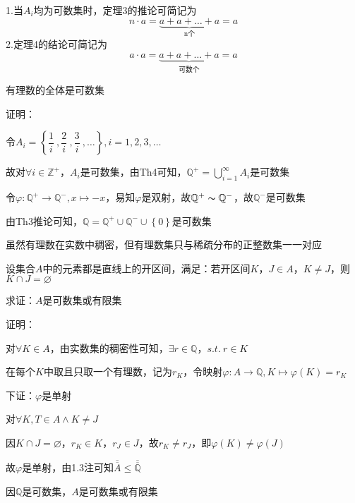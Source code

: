 \begin{wa}
1.当$A_{i}$均为可数集时，定理3的推论可简记为
$$n \cdot a = \underbrace{a + a + \dots + a }_\text{n个}= a$$
\quad \quad \quad 2.定理4的结论可简记为
$$a \cdot a = \underbrace{a + a + \dots + a }_\text{可数个}= a$$    
\end{wa}

\begin{td}
有理数的全体是可数集   
\end{td}
\noindent 证明：
\par 令$A_{i} = \left\{\dfrac{1}{i} \ ,\dfrac{2}{i} \ ,\dfrac{3}{i} \ ,\dots\right\} ,i = 1,2,3,\dots$
\par 故对$\forall i \in \mathbb{Z}^{+}$，$A_{i}$是可数集，由Th4可知，$\mathbb{Q}^{+} = \bigcup \limits_{i=1}^{\infty}A_{i}$是可数集
\par 令$\varphi : \mathbb{Q}^{+} \to \mathbb{Q}^{-} , x \mapsto -x$，易知$\varphi $是双射，故$\mathbb{Q}^{+} \thicksim \mathbb{Q}^{-}$，故$\mathbb{Q}^{-}$是可数集
\par 由Th3推论可知，$\mathbb{Q} = \mathbb{Q}^{+} \cup \mathbb{Q}^{-} \cup \left\{0\right\} $是可数集

\begin{wa}
虽然有理数在实数中稠密，但有理数集只与稀疏分布的正整数集一一对应    
\end{wa}

\begin{eg}
设集合$A$中的元素都是直线上的开区间，满足：若开区间$K$，$J \in A$，$K \neq J$，则$K\cap J = \varnothing$
\par 求证：$A$是可数集或有限集    
\end{eg}
\noindent 证明：
\par 对$\forall K \in A$，由实数集的稠密性可知，$\exists r \in \mathbb{Q} $，$ s.t. \ r \in K$
\par 在每个$K$中取且只取一个有理数，记为$r_{K}$，令映射$\varphi : A \to \mathbb{Q} , K \mapsto \varphi (K) = r_{K}$
\par 下证：$\varphi $是单射
\par \quad \quad \quad 对$\forall K,T \in A \land K \neq J$
\par \quad \quad \quad 因$K\cap J = \varnothing$，$r_{K} \in K$，$r_{J} \in J$，故$r_{K} \neq r_{J}$，即$\varphi (K) \neq \varphi (J)$
\par \quad \quad \quad 故$\varphi $是单射，由1.3注可知$\overline{\overline{A}} \leqslant \overline{\overline{\mathbb{Q}}}$
\par \quad \quad \quad 因$\mathbb{Q}$是可数集，$A$是可数集或有限集

